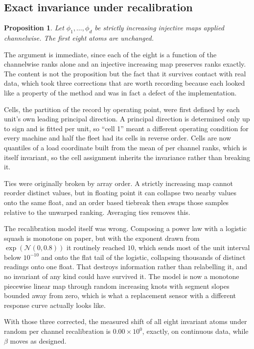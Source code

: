 \documentclass[11pt]{article}
\newtheorem{proposition}{Proposition}
\begin{document}
\subsection{Exact invariance under recalibration}

\begin{proposition}
Let $\phi_1,\dots,\phi_d$ be strictly increasing injective maps applied
channelwise. The first eight atoms are unchanged.
\end{proposition}

The argument is immediate, since each of the eight is a function of the
channelwise ranks alone and an injective increasing map preserves ranks
exactly. The content is not the proposition but the fact that it survives
contact with real data, which took three corrections that are worth recording
because each looked like a property of the method and was in fact a defect of
the implementation.

Cells, the partition of the record by operating point, were first defined by
each unit's own leading principal direction. A principal direction is
determined only up to sign and is fitted per unit, so ``cell 1'' meant a
different operating condition for every machine and half the fleet had its
cells in reverse order. Cells are now quantiles of a load coordinate built from
the mean of per channel ranks, which is itself invariant, so the cell
assignment inherits the invariance rather than breaking it.

Ties were originally broken by array order. A strictly increasing map cannot
reorder distinct values, but in floating point it can collapse two nearby
values onto the same float, and an order based tiebreak then swaps those
samples relative to the unwarped ranking. Averaging ties removes this.

The recalibration model itself was wrong. Composing a power law with a logistic
squash is monotone on paper, but with the exponent drawn from
$\exp(\mathcal{N}(0,0.8))$ it routinely reached $10$, which sends most of the
unit interval below $10^{-10}$ and onto the flat tail of the logistic,
collapsing thousands of distinct readings onto one float. That destroys
information rather than relabelling it, and no invariant of any kind could have
survived it. The model is now a monotone piecewise linear map through random
increasing knots with segment slopes bounded away from zero, which is what a
replacement sensor with a different response curve actually looks like.

With those three corrected, the measured shift of all eight invariant atoms
under random per channel recalibration is $0.00\times10^{0}$, exactly, on
continuous data, while $\beta$ moves as designed.
\end{document}

